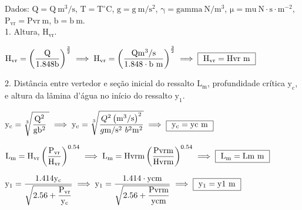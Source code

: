 \documentclass{article}
\newcommand{\myspace}{0.2cm}
\begin{document}

Dados: $\mathrm{Q = {{Q}} \ m^{3}/s}$, $\mathrm{T = {{T}} ^{\circ}C}$, $\mathrm{g = {{g}} \ m/s^{2}}$, $\mathrm{ \gamma = {{gamma}} \ N/m^{3}}$, $\mathrm{ \mu = {{mu}} \ N \! \cdot \! s \! \cdot \! m^{-2}}$, $\mathrm{P_{vr} = {{Pvr}} \ m }$, $\mathrm{ b = {{b}} \ m }$.  \\

1. Altura, $\mathrm{ H_{vr} }$.
\vspace{\myspace}

\begin{center}
	$ 
		\mathrm
		{ 
			H_{vr} = \left ( \dfrac{ Q }{ 1.848b } \right )^{ \frac{3}{2} }
		} 
		\implies
		\mathrm
		{
			H_{vr} = \left ( \dfrac{ {{Q}} m^{3}/s}{ 1.848 \cdot {{b}} \ m } \right )^{ \frac{3}{2} }
		} 
		\implies
		\fbox
		{ 
			$\mathrm
			{ 
				H_{vr} = {{Hvr}} \ m
			}$
		} 
	$ 
\end{center}
\vspace{\myspace}

2. Distância entre vertedor e seção inicial do ressalto $\mathrm{ L_{m} }$, profundidade crítica $\mathrm{ y_{c} }$, e altura da lâmina d'água no início do ressalto $\mathrm{ y_{1} }$.
\vspace{\myspace}
\begin{center}
	$ 
		\mathrm
		{ 
			y_{c}=\sqrt[3]{ \dfrac{ \mathrm{Q}^{2} }{ \mathrm{g}\mathrm{b}^2} \ }
		} 
		\implies
		\mathrm
		{
			y_{c} = \sqrt[3]{ \dfrac{ {{Q}}^{2} \left( \mathrm{m^{3}/s} \right )^{2} }{ {{g}} \mathrm{m/s^{2}} \ {{b}}^{2} \mathrm{m^{2}} } }
		} 
		\implies
		\fbox
		{ 
			$\mathrm
			{ 
				y_{c} = {{yc}} \ m
			}$
		} 
	$ 
\end{center}
\vspace{\myspace}

\begin{center}
	$ 
		\mathrm
		{ 
			L_{m} = H_{vr}\left ( \dfrac{P_{vr}}{H_{vr}} \right )^{0.54}
		} 
		\implies
		\mathrm
		{
			L_{m} = {{Hvr}}m\left ( \dfrac{ {{Pvr}}m }{ {{Hvr}}m } \right )^{0.54}
		} 
		\implies
		\fbox
		{ 
			$\mathrm
			{ 
				L_{m} = {{Lm}} \ m
			}$
		} 
	$ 
\end{center}
\vspace{\myspace}

\begin{center}
	$ 
		\mathrm
		{ 
			y_{1} = \dfrac{ 1.414y_{c} }{ \sqrt{ 2.56 + \dfrac{ P_{vr} }{ y_{c} } } }
		} 
		\implies
		\mathrm
		{
			y_{1} = \dfrac{1.414 \cdot {{yc}}m}{ \sqrt{ 2.56 + \dfrac{ {{Pvr}}m }{ {{yc}}m } } }
		} 
		\implies
		\fbox
		{ 
			$\mathrm
			{
				y_{1}= {{y1}} \ m
			}$
		} 
	$ 
\end{center}
\vspace{\myspace}
\end{document}
